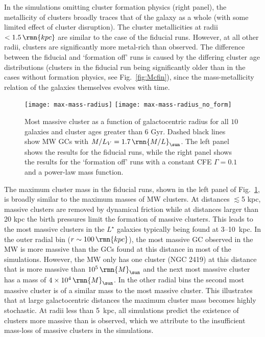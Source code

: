 \documentclass[fleqn,usenatbib]{mnras}
\newcommand\Msun{\,\rmn{M}_{\sun}}
\newcommand\kpc{\,\rmn{kpc}}
\newcommand{\numgal}{10}
\begin{document}
In the simulations omitting cluster formation physics (right panel), the metallicity of clusters broadly traces that of the galaxy as a whole (with some limited effect of cluster disruption). 
The cluster metallicities at radii $<1.5 \kpc$ are similar to the case of the fiducial runs. However, at all other radii, clusters are significantly more metal-rich than observed. The difference between the fiducial and `formation off' runs is caused by the differing cluster age distributions (clusters in the fiducial run being significantly older than in the cases without formation physics, see Fig.~\ref{fig:Mcfin}), since the mass-metallicity relation of the galaxies themselves evolves with time.

\begin{figure*}
  \texttt{[image: max-mass-radius]}
  \texttt{[image: max-mass-radius\_no\_form]}
  \caption{Most massive cluster as a function of galactocentric radius for all $\numgal$ galaxies and cluster ages greater than 6 Gyr. Dashed black lines show MW GCs \citep{Harris_96} with $M/L_V = 1.7 \, \rmn{M/L}_{\sun}$. The left panel shows the results for the fiducial runs, while the right panel shows the results for the `formation off' runs with a constant CFE $\Gamma=0.1$ and a power-law mass function. }
  \label{fig:radial-mass}
\end{figure*}

The maximum cluster mass in the fiducial runs, shown in the left panel of Fig.~\ref{fig:radial-mass}, is broadly similar to the maximum masses of MW clusters. At distances $\lesssim$5 kpc, massive clusters are removed by dynamical friction while at distances larger than 20 kpc the birth pressures limit the formation of massive clusters. This leads to the most massive clusters in the $L^\star$ galaxies typically being found at 3--10~kpc.
In the outer radial bin ($r \sim 100 \kpc$), the most massive GC observed in the MW is more massive than the GCs found at this distance in most of the simulations. However, the MW only has one cluster (NGC 2419) at this distance that is more massive than $10^5 \Msun$ and the next most massive cluster has a mass of $4 \times 10^4 \Msun$. In the other radial bins the second most massive cluster is of a similar mass to the most massive cluster. This illustrates that at large galactocentric distances the maximum cluster mass becomes highly stochastic. At radii less than 5~kpc, all simulations predict the existence of clusters more massive than is observed, which we attribute to the insufficient mass-loss of massive clusters in the simulations.
\end{document}
